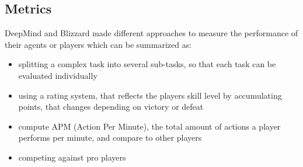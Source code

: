 \subsection{Metrics}
DeepMind and Blizzard made different approaches to measure the performance of their agents or players which can be summarized as:
\begin{itemize}
	\item splitting a complex task into several sub-tasks, so that each task can be evaluated individually \cite{alphastarblog}
	\item using a rating system, that reflects the players skill level by accumulating points, that changes depending on victory or defeat
	\item compute APM (Action Per Minute), the total amount of actions a player performs per minute, and compare to other players  \cite{Vinyals2019}
	\item competing against pro players \cite{2017arXiv170804782V}
\end{itemize}